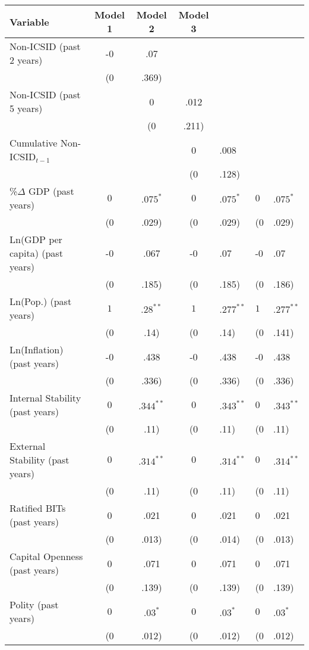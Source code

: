 \begin{table}[ht]
\centering
\begingroup\footnotesize
\begin{tabular}{lccc}
 Variable & Model 1 & Model 2 & Model 3 \\ 
  \hline
\hline
Non-ICSID (past 2 years) & -0&.07 &  &  \\ 
   & (0&.369) &  &  \\ 
  Non-ICSID (past 5 years) &  & 0&.012 &  \\ 
   &  & (0&.211) &  \\ 
  Cumulative Non-ICSID$_{t-1}$ &  &  & 0&.008 \\ 
   &  &  & (0&.128) \\ 
  \%$\Delta$ GDP (past  years) & $0$&$.075^{\ast}$ & $0$&$.075^{\ast}$ & $0$&$.075^{\ast}$ \\ 
   & (0&.029) & (0&.029) & (0&.029) \\ 
  Ln(GDP per capita) (past  years) & -0&.067 & -0&.07 & -0&.07 \\ 
   & (0&.185) & (0&.185) & (0&.186) \\ 
  Ln(Pop.) (past  years) & $1$&$.28^{\ast\ast}$ & $1$&$.277^{\ast\ast}$ & $1$&$.277^{\ast\ast}$ \\ 
   & (0&.14) & (0&.14) & (0&.141) \\ 
  Ln(Inflation) (past  years) & -0&.438 & -0&.438 & -0&.438 \\ 
   & (0&.336) & (0&.336) & (0&.336) \\ 
  Internal Stability (past  years) & $0$&$.344^{\ast\ast}$ & $0$&$.343^{\ast\ast}$ & $0$&$.343^{\ast\ast}$ \\ 
   & (0&.11) & (0&.11) & (0&.11) \\ 
  External Stability (past  years) & $0$&$.314^{\ast\ast}$ & $0$&$.314^{\ast\ast}$ & $0$&$.314^{\ast\ast}$ \\ 
   & (0&.11) & (0&.11) & (0&.11) \\ 
  Ratified BITs (past  years) & 0&.021 & 0&.021 & 0&.021 \\ 
   & (0&.013) & (0&.014) & (0&.013) \\ 
  Capital Openness (past  years) & 0&.071 & 0&.071 & 0&.071 \\ 
   & (0&.139) & (0&.139) & (0&.139) \\ 
  Polity (past  years) & $0$&$.03^{\ast}$ & $0$&$.03^{\ast}$ & $0$&$.03^{\ast}$ \\ 
   & (0&.012) & (0&.012) & (0&.012) \\ 

\end{tabular}
\end{table}
